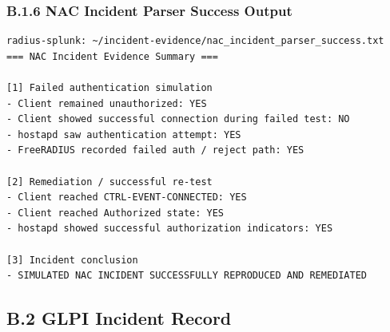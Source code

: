 \documentclass[11pt]{article}
\begin{document}

\subsubsection{B.1.6 NAC Incident Parser Success Output}
\label{sec:appendix-b-nac-incident-parser-success-output}

\begin{verbatim}
radius-splunk: ~/incident-evidence/nac_incident_parser_success.txt
=== NAC Incident Evidence Summary ===

[1] Failed authentication simulation
- Client remained unauthorized: YES
- Client showed successful connection during failed test: NO
- hostapd saw authentication attempt: YES
- FreeRADIUS recorded failed auth / reject path: YES

[2] Remediation / successful re-test
- Client reached CTRL-EVENT-CONNECTED: YES
- Client reached Authorized state: YES
- hostapd showed successful authorization indicators: YES

[3] Incident conclusion
- SIMULATED NAC INCIDENT SUCCESSFULLY REPRODUCED AND REMEDIATED
\end{verbatim}


\subsection{B.2 GLPI Incident Record}
\label{sec:appendix-b-glpi-incident-record}

\end{document}
